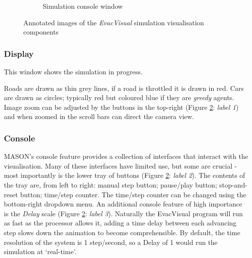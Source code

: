 \begin{figure}
\begin{subfigure}[b]{0.3\textwidth}
         \caption{Simulation console window}
         \label{fig:gui_console}
    \end{subfigure}
    \caption{Annotated images of the \textit{EvacVisual} simulation visualisation components}
    \label{fig:gui}
\end{figure}

\subsubsection{Display}
This window shows the simulation in progress.

Roads are drawn as thin grey lines, if a road is throttled it is drawn in red. Cars are drawn as circles; typically red but coloured blue if they are \textit{greedy} agents. Image zoom can be adjusted by the buttons in the top-right (Figure \ref{fig:gui}: \textit{label 1}) and  when zoomed in the scroll bars can direct the camera view.

\subsubsection{Console}

MASON's console feature provides a collection of interfaces that interact with the visualisation. Many of these interfaces have limited use, but some are crucial - most importantly is the lower tray of buttons (Figure \ref{fig:gui}: \textit{label 2}). The contents of the tray are, from left to right: manual step button; pause/play button; stop-and-reset button; time/step counter. The time/step counter can be changed using the bottom-right dropdown menu. An additional console feature of high importance is the \textit{Delay} scale (Figure \ref{fig:gui}: \textit{label 3}). Naturally the EvacVisual program will run as fast as the processor allows it, adding a time delay between each advancing step slows down the animation to become comprehensible. By default, the time resolution of the system is 1 step/second, so a Delay of 1 would run the simulation at `real-time'. 